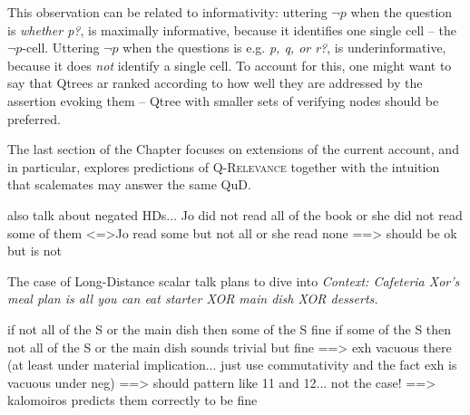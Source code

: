 This observation can be related to informativity: uttering $\neg p$ when the question is \textit{whether p?}, is maximally informative, because it identifies one single cell -- the $\neg p$-cell. Uttering $\neg p$ when the questions is e.g. \textit{p, q, or r?}, is underinformative, because it does \textit{not} identify a single cell. To account for this, one might want to say that Qtrees ar ranked according to how well they are addressed by the assertion evoking them -- Qtree with smaller sets of verifying nodes should be preferred.

The last section of the Chapter focuses on extensions of the current account, and in particular, explores predictions of \textsc{Q-Relevance} together with the intuition that scalemates may answer the same QuD.

also talk about negated HDs...
Jo did not read all of the book or she did not read some of them
<=>Jo read some but not all or she read none
==> should be ok but is not


The case of Long-Distance scalar  talk plans to dive into
\noindent\textit{Context: Cafeteria Xor's meal plan is all you can eat starter XOR main dish XOR desserts.}
\begin{exe}
\end{exe}

if not all of the S or the main dish then some of the S fine
if some of the S then not all of the S or the main dish sounds trivial but fine
==> exh vacuous there (at least under material implication... just use commutativity and the fact exh is vacuous under neg)
==> should pattern like 11 and 12... not the case!
==> kalomoiros predicts them correctly to be fine


